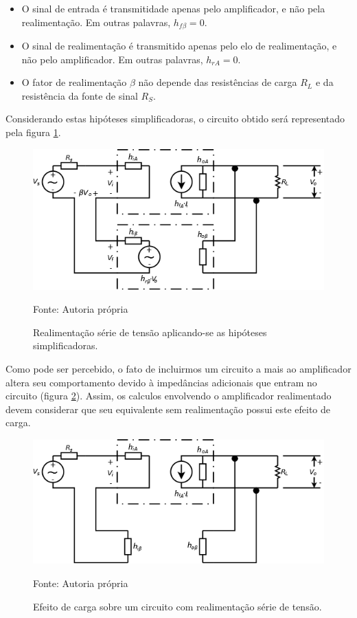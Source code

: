 \documentclass[openright]{normas-utf-tex} %
\begin{document}
\begin{itemize}
\item O sinal de entrada é transmitidade apenas pelo amplificador, e não pela realimentação. Em outras palavras, $h_{f\beta} = 0$.
\item O sinal de realimentação é transmitido apenas pelo elo de realimentação, e não pelo amplificador. Em outras palavras, $h_{rA} = 0$.
\item O fator de realimentação $\beta$ não depende das resistências de carga $R_L$ e da resistência da fonte de sinal $R_S$.
\end{itemize}
Considerando estas hipóteses simplificadoras, o circuito obtido será representado pela figura \ref{fig:serie_tensao_quad_simp}. 

\begin{figure}[ht]
\centering
\includegraphics[width=0.75\linewidth]{img/SerieTensaoQuadSimp.png}
\caption{Realimentação série de tensão aplicando-se as hipóteses simplificadoras.}
Fonte: Autoria própria
\label{fig:serie_tensao_quad_simp}
\end{figure}

Como pode ser percebido, o fato de incluirmos um circuito a mais ao amplificador altera seu comportamento devido à impedâncias adicionais que entram no circuito (figura \ref{fig:serie_tensao_efeito_carga}). Assim, os calculos envolvendo o amplificador realimentado devem considerar que seu equivalente sem realimentação possui este efeito de carga. \cite{pedroni,millman}

\begin{figure}[H]
\centering
\includegraphics[width=0.75\linewidth]{img/SerieTensaoEfeitoCarga.png}
\caption{Efeito de carga sobre um circuito com realimentação série de tensão.}
Fonte: Autoria própria
\label{fig:serie_tensao_efeito_carga}
\end{figure}
\end{document}
